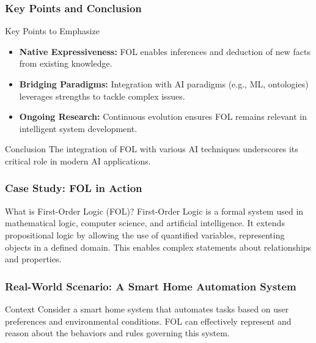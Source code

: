 \documentclass[aspectratio=169]{beamer}
\begin{document}
\begin{frame}[fragile]
  \frametitle{Key Points and Conclusion}
  \begin{block}{Key Points to Emphasize}
    \begin{itemize}
      \item \textbf{Native Expressiveness:} 
        FOL enables inferences and deduction of new facts from existing knowledge.
      \item \textbf{Bridging Paradigms:} 
        Integration with AI paradigms (e.g., ML, ontologies) leverages strengths to tackle complex issues.
      \item \textbf{Ongoing Research:} 
        Continuous evolution ensures FOL remains relevant in intelligent system development.
    \end{itemize}
  \end{block}
  
  \begin{block}{Conclusion}
    The integration of FOL with various AI techniques underscores its critical role in modern AI applications. 
  \end{block}
\end{frame}

\begin{frame}[fragile]
    \frametitle{Case Study: FOL in Action}
    \begin{block}{What is First-Order Logic (FOL)?}
        First-Order Logic is a formal system used in mathematical logic, computer science, and artificial intelligence. 
        It extends propositional logic by allowing the use of quantified variables, representing objects in a defined domain. This enables complex statements about relationships and properties.
    \end{block}
\end{frame}

\begin{frame}[fragile]
    \frametitle{Real-World Scenario: A Smart Home Automation System}
    \begin{block}{Context}
        Consider a smart home system that automates tasks based on user preferences and environmental conditions. 
        FOL can effectively represent and reason about the behaviors and rules governing this system.
    \end{block}
\end{frame}
\end{document}

